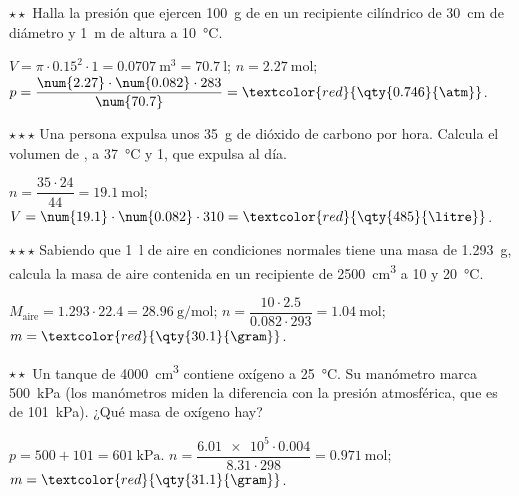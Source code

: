 \begin{exercise}
    \(\star\star\) Halla la presión que ejercen \qty{100}{\gram} de  en un recipiente cilíndrico de \qty{30}{\centi\metre} de diámetro y
    \qty{1}{\metre} de altura a \qty{10}{\degreeCelsius}.
    \begin{solu}
        \(V = \pi \cdot \num{0.15}^2 \cdot 1 = \qty{0.0707}{\cubic\metre} = \qty{70.7}{\litre}\); \(n = \qty{2.27}{\mole}\);
        \(p = \dfrac{\num{2.27} \cdot \num{0.082} \cdot 283}{\num{70.7}} = \textcolor{red}{\qty{0.746}{\atm}}\).
    \end{solu}
\end{exercise}

\begin{exercise}
    \(\star\star\star\) Una persona expulsa unos \qty{35}{\gram} de dióxido de carbono por hora. Calcula el volumen de , a
    \qty{37}{\degreeCelsius} y \qty{1}{\atm}, que expulsa al día.
    \begin{solu}
        \(n = \dfrac{35 \cdot 24}{44} = \qty{19.1}{\mole}\); \(V = \num{19.1} \cdot \num{0.082} \cdot 310 = \textcolor{red}{\qty{485}{\litre}}\).
    \end{solu}
\end{exercise}

\begin{exercise}
    \(\star\star\star\) Sabiendo que \qty{1}{\litre} de aire en condiciones normales tiene una masa de \qty{1.293}{\gram}, calcula la masa de
    aire contenida en un recipiente de \qty{2500}{\cubic\centi\metre} a \qty{10}{\atm} y \qty{20}{\degreeCelsius}.
    \begin{solu}
        \(M_{\text{aire}} = \num{1.293} \cdot \num{22.4} = \qty{28.96}{\gram\per\mole}\); \(n = \dfrac{10 \cdot \num{2.5}}{\num{0.082} \cdot 293} =
        \qty{1.04}{\mole}\); \(m = \textcolor{red}{\qty{30.1}{\gram}}\).
    \end{solu}
\end{exercise}

\begin{exercise}
    \(\star\star\) Un tanque de \qty{4000}{\cubic\centi\metre} contiene oxígeno a \qty{25}{\degreeCelsius}. Su manómetro marca \qty{500}{\kilo\pascal}
    (los manómetros miden la diferencia con la presión atmosférica, que es de \qty{101}{\kilo\pascal}). ¿Qué masa de oxígeno hay?
    \begin{solu}
        \(p = 500 + 101 = \qty{601}{\kilo\pascal}\). \(n = \dfrac{\num{6.01e5} \cdot \num{0.004}}{\num{8.31} \cdot 298} = \qty{0.971}{\mole}\);
        \(m = \textcolor{red}{\qty{31.1}{\gram}}\).
    \end{solu}
\end{exercise}

